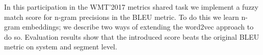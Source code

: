 In this participation in the WMT'2017 metrics shared task we implement a fuzzy match score for n-gram precisions in the BLEU metric. To do this we learn n-gram embeddings; we describe two ways of extending the word2vec approach to do so. Evaluation results show that the introduced score beats the original BLEU metric on system and segment level.
